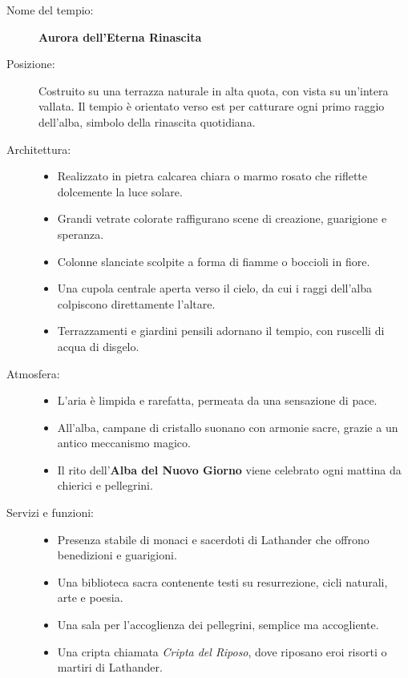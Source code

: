 \documentclass{article}
\begin{document}
                    \begin{description}

  \item[Nome del tempio:] \textbf{Aurora dell’Eterna Rinascita}

  \item[Posizione:]
  Costruito su una terrazza naturale in alta quota, con vista su un’intera vallata. Il tempio è orientato verso est per catturare ogni primo raggio dell’alba, simbolo della rinascita quotidiana.

  \item[Architettura:]
  \begin{itemize}
    \item Realizzato in pietra calcarea chiara o marmo rosato che riflette dolcemente la luce solare.
    \item Grandi vetrate colorate raffigurano scene di creazione, guarigione e speranza.
    \item Colonne slanciate scolpite a forma di fiamme o boccioli in fiore.
    \item Una cupola centrale aperta verso il cielo, da cui i raggi dell’alba colpiscono direttamente l’altare.
    \item Terrazzamenti e giardini pensili adornano il tempio, con ruscelli di acqua di disgelo.
  \end{itemize}

  \item[Atmosfera:]
  \begin{itemize}
    \item L’aria è limpida e rarefatta, permeata da una sensazione di pace.
    \item All’alba, campane di cristallo suonano con armonie sacre, grazie a un antico meccanismo magico.
    \item Il rito dell’\textbf{Alba del Nuovo Giorno} viene celebrato ogni mattina da chierici e pellegrini.
  \end{itemize}

  \item[Servizi e funzioni:]
  \begin{itemize}
    \item Presenza stabile di monaci e sacerdoti di Lathander che offrono benedizioni e guarigioni.
    \item Una biblioteca sacra contenente testi su resurrezione, cicli naturali, arte e poesia.
    \item Una sala per l’accoglienza dei pellegrini, semplice ma accogliente.
    \item Una cripta chiamata \textit{Cripta del Riposo}, dove riposano eroi risorti o martiri di Lathander.
  \end{itemize}


\end{description}
\end{document}
